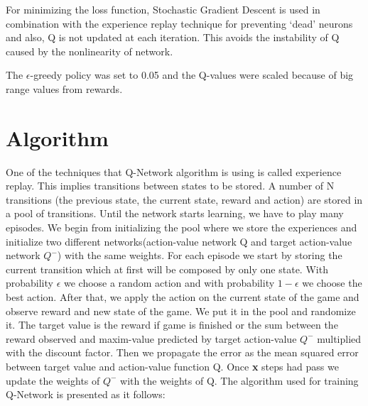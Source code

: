 For minimizing the loss function, Stochastic Gradient Descent is used in combination with the experience replay technique for preventing `dead' neurons and also, Q is not updated at each iteration. This avoids the instability of Q caused by the nonlinearity of network.

The $\epsilon$-greedy policy was set to 0.05 and the Q-values were scaled because of big range values from rewards.
\newpage
\section{Algorithm}

One of the techniques that Q-Network algorithm is using is called experience replay. This implies transitions between states to be stored. A number of N transitions (the previous state, the current state, reward and action) are stored in a pool of transitions. Until the network starts learning, we have to play many episodes. We begin from initializing the pool where we store the experiences and initialize two different networks(action-value network Q and target action-value network $Q^-$) with the same weights. For each episode we start by storing the current transition which at first will be composed by only one state. With probability $\epsilon$ we choose a random action and with probability $1-\epsilon$ we choose the best action. After that, we apply the action on the current state of the game and observe reward and new state of the game. We put it in the pool and randomize it. The target value is the reward if game is finished or the sum between the reward observed and maxim-value predicted by target action-value $Q^-$ multiplied with the discount factor. Then we propagate the error as the mean squared error between target value and action-value function Q. Once \textbf{x} steps had pass we update the weights of $Q^-$ with the weights of Q. The algorithm\cite{atari} used for training Q-Network is presented as it follows:

